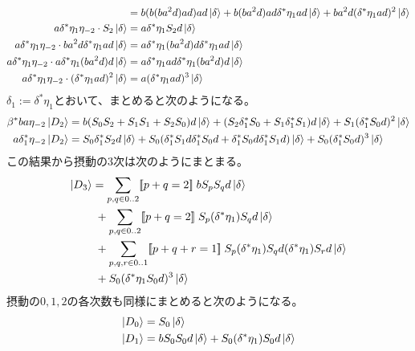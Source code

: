 {\begin{equation*}
\begin{split}
			&= b(b(ba^2d)ad)ad\mathinner{|{\delta}\rangle}
			+ b(ba^2d)ad\delta^*\eta_1ad\mathinner{|{\delta}\rangle}
			+ ba^2d(\delta^*\eta_1ad)^2\mathinner{|{\delta}\rangle} \\
		a\delta^*\eta_1\eta_{-2}\cdot S_2\mathinner{|{\delta}\rangle} 
			&= a\delta^*\eta_1S_2d\mathinner{|{\delta}\rangle} \\
		a\delta^*\eta_1\eta_{-2}\cdot ba^2d\delta^*\eta_1ad\mathinner{|{\delta}\rangle} 
			&= a\delta^*\eta_1(ba^2d)d\delta^*\eta_1ad\mathinner{|{\delta}\rangle} \\
		a\delta^*\eta_1\eta_{-2}\cdot a\delta^*\eta_1(ba^2d)d\mathinner{|{\delta}\rangle} 
			&= a\delta^*\eta_1ad\delta^*\eta_1(ba^2d)d\mathinner{|{\delta}\rangle} \\
		a\delta^*\eta_1\eta_{-2}\cdot (\delta^*\eta_1ad)^2\mathinner{|{\delta}\rangle} 
			&= a(\delta^*\eta_1ad)^3\mathinner{|{\delta}\rangle} \\
	\end{split}\end{equation*}
	$\delta_1:=\delta^*\eta_1$とおいて、まとめると次のようになる。
	\begin{equation*}\begin{split}
		\beta^*ba\eta_{-2}\mathinner{|{D_2}\rangle} 
		&= b(S_0S_2 + S_1S_1 + S_2S_0)d\mathinner{|{\delta}\rangle}
			+ (S_2\delta_1^*S_0 + S_1\delta_1^*S_1)d\mathinner{|{\delta}\rangle}
			+ S_1(\delta_1^*S_0d)^2\mathinner{|{\delta}\rangle} \\
		a\delta_1^*\eta_{-2}\mathinner{|{D_2}\rangle} 
		&= S_0\delta_1^*S_2d\mathinner{|{\delta}\rangle}
			+ S_0(\delta_1^*S_1d\delta_1^*S_0d 
				+ \delta_1^*S_0d\delta_1^*S_1d)\mathinner{|{\delta}\rangle}
			+ S_0(\delta_1^*S_0d)^3\mathinner{|{\delta}\rangle}
	\end{split}\end{equation*}
	この結果から摂動の$3$次は次のようにまとまる。
	\begin{equation*}\begin{split}
		\mathinner{|{D_3}\rangle} &= \sum_{p,q\in0..2}[\![p+q=2]\!]\; bS_pS_qd\mathinner{|{\delta}\rangle} \\
		&\;+ \sum_{p,q\in0..2}[\![p+q=2]\!]\;
			S_p(\delta^*\eta_1)S_qd\mathinner{|{\delta}\rangle} \\
		&\;+ \sum_{p,q,r\in0..1}[\![p+q+r=1]\!]\;
			S_p(\delta^*\eta_1)S_qd(\delta^*\eta_1)S_rd\mathinner{|{\delta}\rangle} \\
		&\;+ S_0(\delta^*\eta_1S_0d)^3\mathinner{|{\delta}\rangle} \\
	\end{split}\end{equation*}
	摂動の$0,1,2$の各次数も同様にまとめると次のようになる。
	\begin{equation*}\begin{split}
		\ket{D_0} &= S_0\ket{\delta} \\
		\ket{D_1} &= bS_0S_0d\ket{\delta} 
			+ S_0(\delta^*\eta_1)S_0d\ket{\delta} \\

\end{split}
\end{equation*}}
